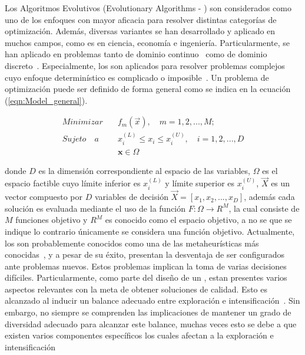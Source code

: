 Los Algoritmos Evolutivos (Evolutionary Algorithms - \EAS{}) son considerados como uno de los enfoques con mayor aficacia para resolver distintas categorías de optimización.
%
Además, diversas variantes se han desarrollado y aplicado en muchos campos, como es en ciencia, economía e ingeniería.
%
Particularmente, se han aplicado en problemas tanto de dominio continuo~\cite{glover2005handbook} como de dominio discreto~\cite{Joel:Dynamic_FAP}.
%
Especialmente, los \EAS{} son aplicados para resolver problemas complejos cuyo enfoque determinístico es complicado o imposible~\cite{chakraborty2008advances}.
% 
Un problema de optimización puede ser definido de forma general como se indica en la ecuación (\ref{eqn:Model_general}).

\begin{equation}
 \label{eqn:Model_general}
   \begin{split}
    Minimizar \quad & f_m(\vec{x}), \quad m = 1, 2,...,M;\\
   Sujeto \quad a \quad &  x_i^{(L)} \leq x_i \leq x_i^{(U)}, \quad i=1,2,..., D \\
   & \mathbf{x} \in \Omega
   \end{split}
\end{equation}

donde $D$ es la dimensión correspondiente al espacio de las variables, $\Omega$ es el espacio factible cuyo límite inferior es $x_i^{(L)}$ y límite superior es $x_i^{(U)}$, $\vec{X}$ es un vector compuesto por $D$ variables de decisión $\vec{X} = [x_1, x_2, ..., x_D]$, además cada solución es evaluada mediante el uso de la función $F : \Omega \rightarrow R^M$, la cual consiste de $M$ funciones objetivo y $R^M$ es conocido como el espacio objetivo, a no se que se indique lo contrario únicamente se considera una función objetivo.
%
Actualmente, los \EAS{} son probablemente conocidos como una de las metaheurísticas más conocidas~\cite{glover2005handbook}, y a pesar de su éxito, presentan la desventaja de ser configurados ante problemas nuevos.
%
Estos problemas implican la toma de varias decisiones difíciles.
%
Particularmente, como parte del diseño de un \EA{}, estan presentes varios aspectos relevantes con la meta de obtener soluciones de calidad.
%
Esto es alcanzado al inducir un balance adecuado entre exploración e intensificación~\cite{herrera1996adaptation}.
%
Sin embargo, no siempre se comprenden las implicaciones de mantener un grado de diversidad adecuado para alcanzar este balance, muchas veces esto se debe a que existen varios componentes específicos los cuales afectan a la exploración e intensificación~\cite{Crepinsek:13}
%

